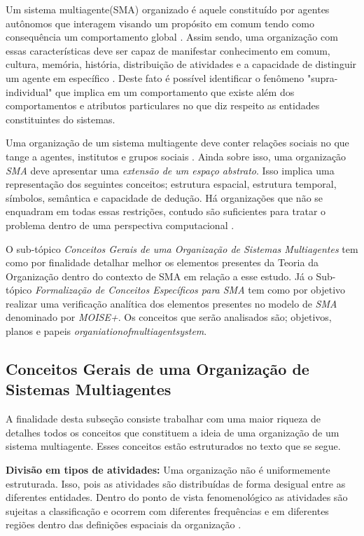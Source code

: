 Um sistema multiagente(SMA) organizado é aquele constituído por agentes autônomos que interagem visando um propósito em comum tendo como consequência um comportamento global \cite{moiseframework} \cite{organiationofmultiagentsystem}. Assim sendo, uma organização com essas características deve ser capaz de manifestar conhecimento em comum, cultura, memória, história, distribuição de atividades e a capacidade de distinguir um  agente em específico \cite{organiationofmultiagentsystem}. Deste fato é possível identificar o fenômeno "supra-individual" que implica em um comportamento que existe além dos comportamentos e atributos particulares no que diz respeito as entidades constituintes do sistemas. 

Uma organização de um sistema multiagente deve conter relações sociais no que tange a agentes, institutos e grupos sociais \cite{organiationofmultiagentsystem}. Ainda sobre isso, uma organização \textit{SMA} deve apresentar uma \textit{extensão de um espaço abstrato}. Isso implica uma representação dos seguintes conceitos; estrutura espacial, estrutura temporal, símbolos, semântica e 
capacidade de dedução. Há organizações que não se enquadram em todas essas restrições, contudo são suficientes para tratar o problema dentro de uma perspectiva computacional \cite{organiationofmultiagentsystem}.

O sub-tópico \textit{Conceitos Gerais de uma Organização de Sistemas Multiagentes} tem como por finalidade detalhar melhor os elementos presentes da Teoria da Organização dentro do contexto de SMA em relação a esse estudo. Já o Sub-tópico \textit{Formalização de Conceitos Específicos para SMA} tem como por objetivo realizar uma verificação analítica dos elementos presentes no modelo de \textit{SMA} 
denominado por \textit{MOISE+}. Os conceitos que serão analisados são; objetivos, planos e papeis \textit{organiationofmultiagentsystem}.
   

\subsection{Conceitos Gerais de uma Organização de Sistemas Multiagentes}

A finalidade desta subseção consiste trabalhar com uma maior riqueza de detalhes todos os conceitos que constituem a ideia de uma organização de um sistema multiagente. Esses conceitos estão estruturados no texto que se segue.
  
\textbf{Divisão em tipos de atividades:} Uma organização não é uniformemente estruturada. Isso, pois as atividades são distribuídas de forma desigual entre as diferentes entidades. Dentro do ponto de vista fenomenológico as atividades são sujeitas a classificação e ocorrem com diferentes frequências e em diferentes regiões dentro das definições espaciais da organização \cite{organiationofmultiagentsystem}.

